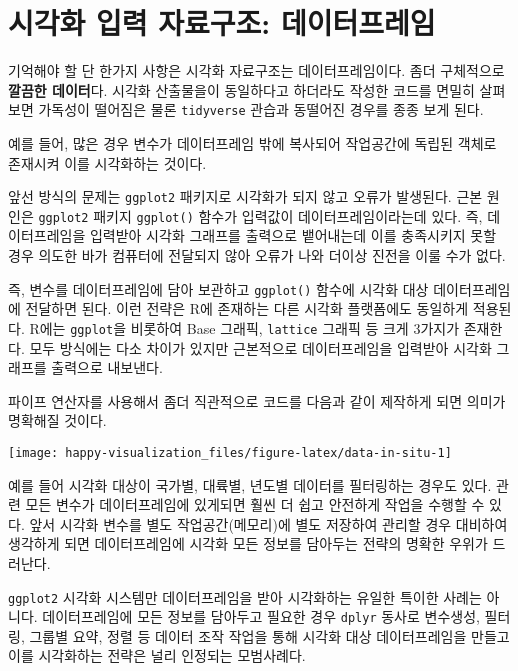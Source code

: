 \documentclass[
]{book}
\begin{document}
\hypertarget{viz-secret-dataframe}{%
\section{시각화 입력 자료구조: 데이터프레임}\label{viz-secret-dataframe}}

기억해야 할 단 한가지 사항은 시각화 자료구조는 데이터프레임이다.
좀더 구체적으로 \textbf{깔끔한 데이터}다.
시각화 산출물을이 동일하다고 하더라도 작성한 코드를 면밀히 살펴보면
가독성이 떨어짐은 물론 \texttt{tidyverse} 관습과 동떨어진 경우를 종종 보게 된다.

예를 들어, 많은 경우 변수가 데이터프레임 밖에 복사되어
작업공간에 독립된 객체로 존재시켜 이를 시각화하는 것이다.

앞선 방식의 문제는 \texttt{ggplot2} 패키지로 시각화가 되지 않고 오류가 발생된다.
근본 원인은 \texttt{ggplot2} 패키지 \texttt{ggplot()} 함수가 입력값이 데이터프레임이라는데 있다.
즉, 데이터프레임을 입력받아 시각화 그래프를 출력으로 뱉어내는데 이를 충족시키지 못할 경우
의도한 바가 컴퓨터에 전달되지 않아 오류가 나와 더이상 진전을 이룰 수가 없다.

즉, 변수를 데이터프레임에 담아 보관하고 \texttt{ggplot()} 함수에 시각화 대상 데이터프레임에 전달하면 된다.
이런 전략은 R에 존재하는 다른 시각화 플랫폼에도 동일하게 적용된다.
R에는 \texttt{ggplot}을 비롯하여 Base 그래픽, \texttt{lattice} 그래픽 등 크게 3가지가 존재한다.
모두 방식에는 다소 차이가 있지만 근본적으로 데이터프레임을 입력받아 시각화 그래프를 출력으로 내보낸다.

파이프 연산자를 사용해서 좀더 직관적으로 코드를 다음과 같이 제작하게 되면
의미가 명확해질 것이다.

\begin{center}\texttt{[image: happy-visualization\_files/figure-latex/data-in-situ-1]} \end{center}

예를 들어 시각화 대상이 국가별, 대륙별, 년도별 데이터를 필터링하는 경우도 있다.
관련 모든 변수가 데이터프레임에 있게되면 훨씬 더 쉽고 안전하게 작업을 수행할 수 있다.
앞서 시각화 변수를 별도 작업공간(메모리)에 별도 저장하여 관리할 경우 대비하여
생각하게 되면 데이터프레임에 시각화 모든 정보를 담아두는 전략의 명확한 우위가 드러난다.

\texttt{ggplot2} 시각화 시스템만 데이터프레임을 받아 시각화하는 유일한 특이한 사례는 아니다.
데이터프레임에 모든 정보를 담아두고 필요한 경우 \texttt{dplyr} 동사로 변수생성, 필터링,
그룹별 요약, 정렬 등 데이터 조작 작업을 통해 시각화 대상 데이터프레임을 만들고
이를 시각화하는 전략은 널리 인정되는 모범사례다.
\end{document}
